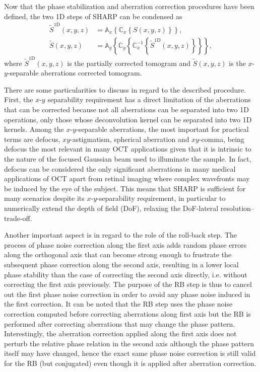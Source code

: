 Now that the phase stabilization and aberration correction procedures have been defined, the two 1D steps of SHARP can be condensed as
\begin{align}
    \tilde{S}^{\text{1D}}(x,y,z) &= \mathbb{A}_x\left\{ \mathbb{C}_x\left\{ S(x,y,z) \right\} \right\}, \\
    \tilde{S}(x,y,z) &= \mathbb{A}_y\left\{ \mathbb{C}_y\left\{ \mathbb{C}^{-1}_x\left\{  \tilde{S}^{\text{1D}}(x,y,z) \right\} \right\} \right\},
\end{align}
where $\tilde{S}^{\text{1D}}(x,y,z)$ is the partially corrected tomogram and $\tilde{S}(x,y,z)$ is the $x$-$y$-separable aberrations corrected tomogram.

There are some particularities to discuss in regard to the described procedure. First, the $x$-$y$ separability requirement has a direct limitation of the aberrations that can be corrected because not all aberrations can be separated into two 1D operations, only those whose deconvolution kernel can be separated into two 1D kernels. Among the $x$-$y$-separable aberrations, the most important for practical terms are defocus, $xy$-astigmatism, spherical aberration and $xy$-comma, being defocus the most relevant in many OCT applications given that it is intrinsic to the nature of the focused Gaussian beam used to illuminate the sample. In fact, defocus can be considered the only significant aberrations in many medical applications of OCT apart from retinal imaging where complex wavefronts may be induced by the eye of the subject. This means that SHARP is sufficient for many scenarios despite its $x$-$y$-separability requirement, in particular to numerically extend the depth of field (DoF), relaxing the DoF-lateral resolution--trade-off.

Another important aspect is in regard to the role of the roll-back step. The process of phase noise correction along the first axis adds random phase errors along the orthogonal axis that can become strong enough to frustrate the subsequent phase correction along the second axis, resulting in a lower local phase stability than the case of correcting the second axis directly, i.e. without correcting the first axis previously. The purpose of the RB step is thus to cancel out the first phase noise correction in order to avoid any phase noise induced in the first correction. It can be noted that the RB step uses the phase noise correction computed before correcting aberrations along first axis but the RB is performed after correcting aberrations that may change the phase pattern. Interestingly, the aberration correction applied along the first axis does not perturb the relative phase relation in the second axis although the phase pattern itself may have changed, hence the exact same phase noise correction is still valid for the RB (but conjugated) even though it is applied after aberration correction.

